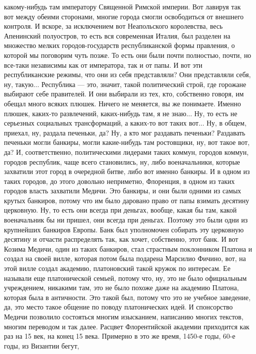 какому-нибудь там императору Священной Римской империи. Вот лавируя так вот
между обеими сторонами, многие города смогли освободиться от внешнего контроля.
И вскоре, за исключением вот Неапольского королевства, весь Апенинский
полуостров, то есть вся современная Италия, был разделен на множество мелких
городов-государств республиканской формы правления, о которой мы поговорим чуть
позже. То есть они были почти полностью, почти, но все-таки независимы как от
императора, так и от папы. И вот эти республиканские режимы, что они из себя
представляли? Они представляли себя, ну, такую... Республика — это, значит,
такой политический строй, где горожане выбирают себе правителей. И они выбирали
из тех, кто, собственно говоря, им обещал много всяких плюшек. Ничего не
меняется, вы же понимаете. Именно плюшек, каких-то развлечений, каких-нибудь
там, я не знаю... Ну, то есть не серьезных социальных трансформаций, а каких-то
вот таких вот... Ну, в общем, приехал, ну, раздала печеньки, да? Ну, а кто мог
раздавать печеньки? Раздавать печеньки могли банкиры, могли какие-нибудь там
ростовщики, ну, вот такое вот, да? И, соответственно, политическими лидерами
таких коммун, городов коммун, городов республик, чаще всего становились, ну,
либо военачальники, которые захватили этот город в очередной битве, либо вот
именно банкиры. И в одном из таких городов, до этого довольно неприметно,
Флоренция, в одном из таких городов власть захватили Медичи. Это банкиры, и они
были одними из самых крутых банкиров, потому что им было даровано право от папы
взимать десятину церковную. Ну, то есть они всегда при деньгах, вообще, какая бы
там, какой военачальник бы ни пришел, они всегда при деньгах. Поэтому это были
одни из крупнейших банкиров Европы. Банк был уполномочен собирать эту церковную
десятину и отчасти распределять так, как хочет, собственно, этот банк. И вот
Козима Медичи, один из таких банкиров, стал страстным поклонником Платона и
создал на своей вилле, которая потом была подарена Марсилио Фичино, вот, на этой
вилле создал академию, платоновский такой кружок по интересам. Ее называли еще
платонической семьей, потому что, ну, это не было официальным учреждением,
никакими там, это не было похоже даже на академию Платона, которая была в
античности. Это такой был, потому что это не учебное заведение, да, это место
такое общение по поводу платонических идей. И спонсорство Медичи позволило
состояться многим изысканием, написанию многих текстов, многим переводом и так
далее. Расцвет Флорентийской академии приходится как раз на 15 век, на конец 15
века. Примерно в это же время, 1450-е годы, 60-е годы, из Византии бегут,
